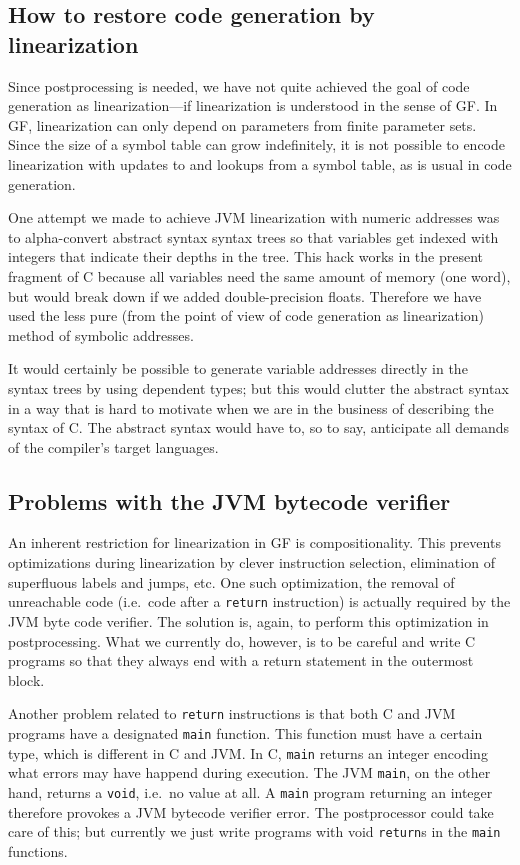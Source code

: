 \documentclass[12pt]{article}
\begin{document}
\subsection{How to restore code generation by linearization}

Since postprocessing is needed, we have not quite achieved
the goal of code generation as linearization---if
linearization is understood in the
sense of GF. In GF, linearization can only depend 
on parameters from finite parameter sets. Since the size of
a symbol table can grow indefinitely, it is not 
possible to encode linearization with updates to and 
lookups from a symbol table, as is usual in code generation. 

One attempt we made to achieve JVM linearization with
numeric addresses was to alpha-convert abstract syntax syntax trees
so that variables get indexed with integers that indicate their 
depths in the tree. This hack works in the present fragment of C
because all variables need the same amount of memory (one word), 
but would break down if we added double-precision floats. Therefore
we have used the less pure (from the point of view of
code generation as linearization) method of
symbolic addresses.

It would certainly be possible to generate variable addresses
directly in the syntax trees by using dependent types; but this 
would clutter the abstract
syntax in a way that is hard to motivate when we are in
the business of describing the syntax of C. The abstract syntax would
have to, so to say, anticipate all demands of the compiler's
target languages. 


\subsection{Problems with the JVM bytecode verifier}

An inherent restriction for linearization in GF is compositionality.
This prevents optimizations during linearization
by clever instruction selection, elimination of superfluous
labels and jumps, etc. One such optimization, the removal
of unreachable code (i.e.\ code after a \texttt{return} instruction)
is actually required by the JVM byte code verifier.
The solution is, again, to perform this optimization in postprocessing.
What we currently do, however, is to be careful and write
C programs so that they always end with a return statement in the
outermost block.

Another problem related to \texttt{return} instructions is that
both C and JVM programs have a designated \texttt{main} function.
This function must have a certain type, which is different in C and
JVM. In C, \texttt{main} returns an integer encoding what
errors may have happend during execution. The JVM 
\texttt{main}, on the other hand, returns a \texttt{void}, i.e.\
no value at all. A \texttt{main} program returning an
integer therefore provokes a JVM bytecode verifier error.
The postprocessor could take care of this; but currently
we just write programs with void \texttt{return}s in the 
\texttt{main} functions.
\end{document}
